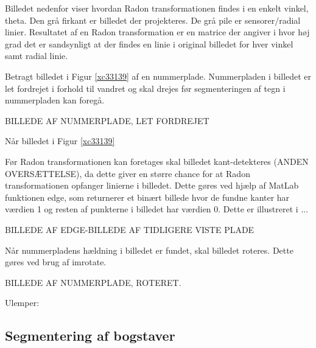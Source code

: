 Billedet nedenfor viser hvordan Radon transformationen findes i en enkelt vinkel, theta. Den grå firkant er billedet der projekteres. De grå pile er sensorer/radial linier. Resultatet af en Radon transformation er en matrice der angiver i hvor høj grad det er sandsynligt at der findes en linie i original billedet for hver vinkel samt radial linie.


Betragt billedet i Figur \ref{xc33139} af en nummerplade. Nummerpladen i billedet er let fordrejet i forhold til vandret og skal drejes før segmenteringen af tegn i nummerpladen kan foregå.

BILLEDE AF NUMMERPLADE, LET FORDREJET


Når billedet i Figur \ref{xc33139}

Før Radon transformationen kan foretages skal billedet kant-detekteres (ANDEN OVERSÆTTELSE), da dette giver en større chance for at Radon transformationen opfanger linierne i billedet. Dette gøres ved hjælp af MatLab funktionen edge, som returnerer et binært billede hvor de fundne kanter har værdien 1 og resten af punkterne i billedet har værdien 0. Dette er illustreret i ...

BILLEDE AF EDGE-BILLEDE AF TIDLIGERE VISTE PLADE


Når nummerpladens hældning i billedet er fundet, skal billedet roteres. Dette gøres ved brug af imrotate. 

BILLEDE AF NUMMERPLADE, ROTERET.

Ulemper:

\subsection{Segmentering af bogstaver}

